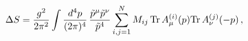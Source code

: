 \begin{equation}
\Delta S ={g^2 \over 2 \pi^2} \int {d^4 p \over (2 \pi)^4}
\, {{\tilde p}^\mu {\tilde p}^\nu \over
{\tilde p}^4 } \sum_{i,j=1}^N M_{ij} \, {\rm Tr}\, A_\mu^{(i)}(p) 
{\rm Tr}\, A_\nu^{(j)}(-p) \, ,
\label{pole}
\end{equation}

